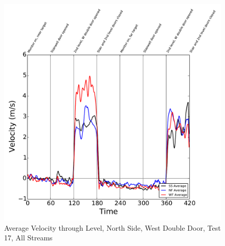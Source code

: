 \documentclass[12pt,oneside]{book}
\begin{document}
\begin{figure}[!ht]
\includegraphics[width=6in]{../../../Figures/Hose_Test_Figures/Test_17_West_063014_BDP_A13_Avg}
\caption{Average Velocity through  Level, North Side, West Double Door, Test 17, All Streams}
\label{fig:Test_17_BDP_A13_Avg_All}
\end{figure}

\clearpage

\end{document}
